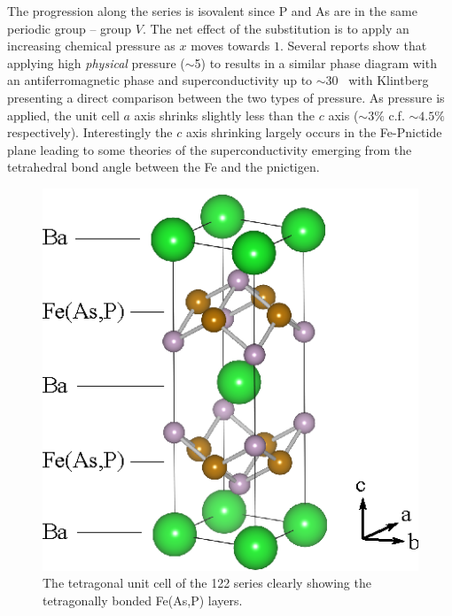  The progression along the series is isovalent since P and As are in the same periodic group -- group $V$. The net effect of the substitution is to apply an increasing chemical pressure as $x$ moves towards $1$. Several reports show that applying high \emph{physical} pressure ($\sim$\unit{5}{\giga\pascal}) to \BaFeAs results in a similar phase diagram with an antiferromagnetic phase and superconductivity up to $\sim$\unit{30}{\kelvin}~\cite{Yamazaki2010,Colombier2009,Alireza2009} with Klintberg \etal~\cite{Klintberg2010} presenting a direct comparison between the two types of pressure. As pressure is applied, the unit cell $a$ axis shrinks slightly less than the $c$ axis ($\sim3\%$ c.f. $\sim4.5\%$ respectively). Interestingly the $c$ axis shrinking largely occurs in the Fe-Pnictide plane leading to some theories of the superconductivity emerging from the tetrahedral bond angle between the Fe and the pnictigen. 
\begin{figure}[htbp]
    \begin{center}
        \includegraphics[scale=1.0]{Chapter-Introduction/Figures/UnitCell/UnitCell}
        \caption{The tetragonal unit cell of the 122 \BaFePAs series clearly showing the tetragonally bonded Fe(As,P) layers.}
        \label{Fig:Intro:UnitCell}
    \end{center}
\end{figure}


